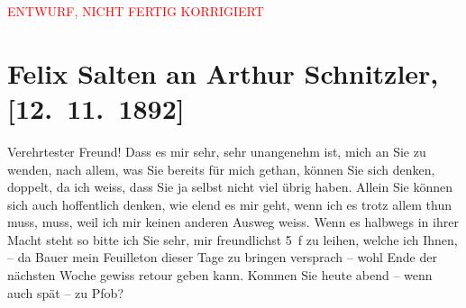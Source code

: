 
\begin{center}
            \textcolor{red}{ENTWURF, NICHT FERTIG KORRIGIERT}
                      \end{center}
            
         
         \renewcommand{\erwaehntePersonen}{Personen: Julius Bauer, Paul Horn}
         \renewcommand{\erwaehnteOrte}{Orte: Café Pfob, Café Union, Riedhof, Volkstheater, Wien}
         \renewcommand{\erwaehnteWerke}{Werke: ?? [Feuilleton], Musotte, Tagebuch}
               \section[Felix Salten an Arthur Schnitzler, {[}12. 11. 1892{]}]{ Felix Salten an Arthur Schnitzler, {[}12. 11. 1892{]}}\nopagebreak{}\rehead{ }\begin{ledgroupsized}[t]{13cm}\normalsize\beginnumbering \toendnotes[C]{\smallbreak\pagebreak[2]} 
\toendnotes[C]{\smallbreak}\pstart
           \noindent{}{\pb}Verehrtester Freund! Dass es mir sehr, sehr unangenehm ist, mich an
               Sie zu wenden, nach allem, was Sie bereits für mich gethan, können Sie sich denken,
               doppelt, da ich weiss, dass Sie ja selbst nicht viel übrig haben. Allein Sie können
               sich auch hoffentlich denken, wie elend es mir geht, wenn ich es trotz allem thun
               muss, muss, weil ich mir keinen anderen Ausweg weiss. Wenn es halbwegs in ihrer Macht steht so bitte ich Sie sehr, mir
               freundlichst 5 f zu leihen, welche ich {\pb}Ihnen, – da Bauer mein Feuilleton dieser Tage zu bringen versprach – wohl Ende der nächsten Woche
                  \introOben{}gewiss\introOben{} retour geben kann. \pend
           \pstart
           Kommen Sie heute abend – wenn auch spät – zu Pfob?

\end{ledgroupsized}
